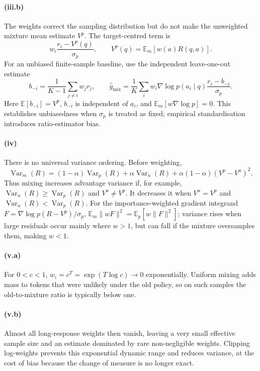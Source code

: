 \paragraph{(iii.b)}
The weights correct the sampling distribution but do not make the unweighted mixture
mean estimate $V^p$.  The target-centred term is
\begin{equation}
 w_i\frac{r_i-V^p(q)}{\sigma_p},
 \qquad V^p(q)=\mathbb{E}_m[w(a)R(q,a)].
\end{equation}
For an unbiased finite-sample baseline, use the independent leave-one-out estimate
\begin{equation}
 b_{-i}=\frac{1}{K-1}\sum_{j\ne i}w_jr_j,
 \qquad
 \boxed{\displaystyle
 \hat g_{\mathrm{mix}}=\frac{1}{K}\sum_i w_i\nabla\log p(a_i\mid q)
 \frac{r_i-b_{-i}}{\sigma_p}.}
 \label{eq:unbiased-mix-estimator}
\end{equation}
Here $\mathbb{E}[b_{-i}]=V^p$, $b_{-i}$ is independent of $a_i$, and
$\mathbb{E}_m[w\nabla\log p]=0$.  This establishes unbiasedness when $\sigma_p$ is
treated as fixed; empirical standardisation introduces ratio-estimator bias.

\paragraph{(iv)}
There is no universal variance ordering.  Before weighting,
\begin{equation}
 \operatorname{Var}_m(R)=(1-\alpha)\operatorname{Var}_p(R)
 +\alpha\operatorname{Var}_u(R)+\alpha(1-\alpha)(V^p-V^u)^2.
 \label{eq:mixture-variance}
\end{equation}
Thus mixing increases advantage variance if, for example,
$\operatorname{Var}_u(R)\ge\operatorname{Var}_p(R)$ and $V^u\ne V^p$.  It decreases
it when $V^u=V^p$ and $\operatorname{Var}_u(R)<\operatorname{Var}_p(R)$.
For the importance-weighted gradient integrand
$F=\nabla\log p(R-V^p)/\sigma_p$,
$\mathbb{E}_m\lVert wF\rVert^2=\mathbb{E}_p[w\lVert F\rVert^2]$; variance rises when
large residuals occur mainly where $w>1$, but can fall if the mixture oversamples them,
making $w<1$.

\paragraph{(v.a)}
For $0<c<1$, $w_i=c^T=\exp(T\log c)\to0$ exponentially.  Uniform mixing adds mass to
tokens that were unlikely under the old policy, so on such samples the old-to-mixture
ratio is typically below one.

\paragraph{(v.b)}
Almost all long-response weights then vanish, leaving a very small effective sample size
and an estimate dominated by rare non-negligible weights.  Clipping log-weights prevents
this exponential dynamic range and reduces variance, at the cost of bias because the
change of measure is no longer exact.
